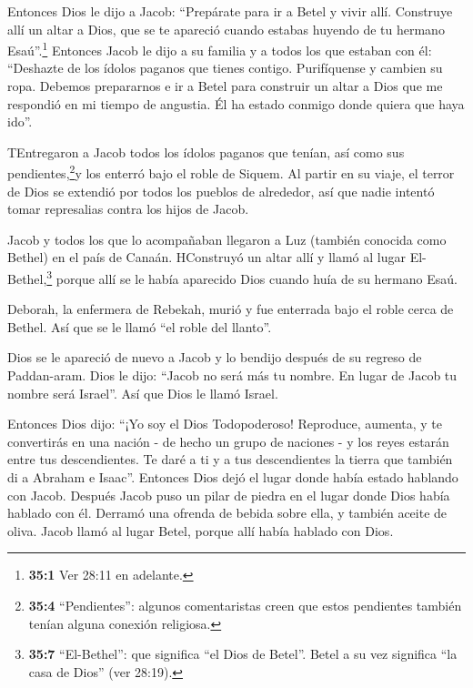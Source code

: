  Entonces Dios le dijo a Jacob: ``Prepárate para ir a Betel
y vivir allí. Construye allí un altar a Dios, que se te apareció cuando
estabas huyendo de tu hermano Esaú''.\footnote{\textbf{35:1} Ver 28:11
  en adelante.}  Entonces Jacob le dijo a su familia y a
todos los que estaban con él: ``Deshazte de los ídolos paganos que
tienes contigo. Purifíquense y cambien su ropa.  Debemos
prepararnos e ir a Betel para construir un altar a Dios que me respondió
en mi tiempo de angustia. Él ha estado conmigo donde quiera que haya
ido''.

 TEntregaron a Jacob todos los ídolos paganos que tenían,
así como sus pendientes,\footnote{\textbf{35:4} ``Pendientes'': algunos
  comentaristas creen que estos pendientes también tenían alguna
  conexión religiosa.}y los enterró bajo el roble de Siquem.
 Al partir en su viaje, el terror de Dios se extendió por
todos los pueblos de alrededor, así que nadie intentó tomar represalias
contra los hijos de Jacob.

 Jacob y todos los que lo acompañaban llegaron a Luz
(también conocida como Bethel) en el país de Canaán. 
HConstruyó un altar allí y llamó al lugar El-Bethel,\footnote{\textbf{35:7}
  ``El-Bethel'': que significa ``el Dios de Betel''. Betel a su vez
  significa ``la casa de Dios'' (ver 28:19).} porque allí se le había
aparecido Dios cuando huía de su hermano Esaú.

 Deborah, la enfermera de Rebekah, murió y fue enterrada
bajo el roble cerca de Bethel. Así que se le llamó ``el roble del
llanto''.

 Dios se le apareció de nuevo a Jacob y lo bendijo después
de su regreso de Paddan-aram.  Dios le dijo: ``Jacob no
será más tu nombre. En lugar de Jacob tu nombre será Israel''. Así que
Dios le llamó Israel.

 Entonces Dios dijo: ``¡Yo soy el Dios Todopoderoso!
Reproduce, aumenta, y te convertirás en una nación - de hecho un grupo
de naciones - y los reyes estarán entre tus descendientes. 
Te daré a ti y a tus descendientes la tierra que también di a Abraham e
Isaac''.  Entonces Dios dejó el lugar donde había estado
hablando con Jacob.  Después Jacob puso un pilar de piedra
en el lugar donde Dios había hablado con él. Derramó una ofrenda de
bebida sobre ella, y también aceite de oliva.  Jacob llamó
al lugar Betel, porque allí había hablado con Dios.

